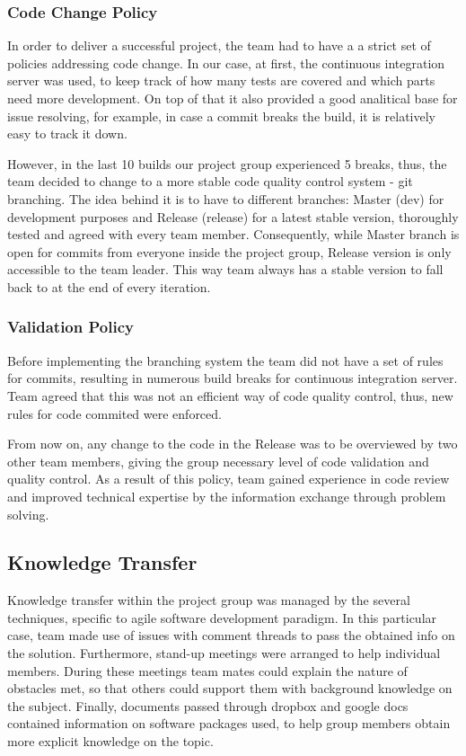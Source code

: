 \documentclass[10pt]{article}
\begin{document}
\subsubsection{Code Change Policy}

In order to deliver a successful project, the team had to have a a strict set of policies addressing code change. In our case, at first, the continuous integration server was used, to keep track of how many tests are covered and which parts need more development. On top of that it also provided a good analitical base for issue resolving, for example, in case a commit breaks the build, it is relatively easy to track it down.

However, in the last 10 builds our project group experienced 5 breaks, thus, the team decided to change to a more stable code quality control system - git branching. The idea behind it is to have to different branches: Master (dev) for development purposes and Release (release) for a latest stable version, thoroughly tested and agreed with every team member. Consequently, while Master branch is open for commits from everyone inside the project group, Release version is only accessible to the team leader. This way team always has a stable version to fall back to at the end of every iteration.

\subsubsection{Validation Policy}

Before implementing the branching system the team did not have a set of rules for commits, resulting in numerous build breaks for continuous integration server. Team agreed that this was not an efficient way of code quality control, thus, new rules for code commited were enforced. 

From now on, any change to the code in the Release was to be overviewed by two other team members, giving the group necessary level of code validation and quality control. As a result of this policy, team gained experience in code review and improved technical expertise by the information exchange through problem solving.

\subsection{Knowledge Transfer}

Knowledge transfer within the project group was managed by the several techniques, specific to agile software development paradigm. In this particular case, team made use of issues with comment threads to pass the obtained info on the solution. Furthermore, stand-up meetings were arranged to help individual members. During these meetings team mates could explain the nature of obstacles met, so that others could support them with background knowledge on the subject. Finally, documents passed through dropbox and google docs contained information on software packages used, to help group members obtain more explicit knowledge on the topic.
\end{document}
